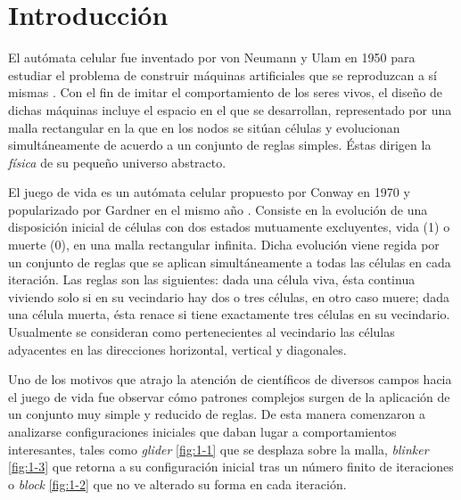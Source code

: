 \documentclass[../proyecto.tex]{book}
\begin{document}
\chapter{Introducción}

El autómata celular fue inventado por von Neumann y Ulam en 1950 para estudiar el problema de construir máquinas artificiales que se reproduzcan a sí mismas \cite{neummanUlam}. Con el fin de imitar el comportamiento de los seres vivos, el diseño de dichas máquinas incluye el espacio en el que se desarrollan, representado por una malla rectangular en la que en los nodos se sitúan células y evolucionan simultáneamente de acuerdo a un conjunto de reglas simples. Éstas dirigen la \textit{física} de su pequeño universo abstracto. 



El juego de vida es un autómata celular propuesto por Conway en 1970 y popularizado por Gardner en el mismo año \cite{primerap}. Consiste en la evolución de una disposición inicial de células con dos estados mutuamente excluyentes, vida (1) o muerte (0), en una malla rectangular infinita. Dicha evolución viene regida por un conjunto de reglas que se aplican simultáneamente a todas las células en cada iteración. Las reglas son las siguientes: dada una célula viva, ésta continua viviendo solo si en su vecindario hay dos o tres células, en otro caso muere; dada una célula muerta, ésta renace si tiene exactamente tres células en su vecindario. Usualmente se consideran como pertenecientes al vecindario las células adyacentes en las direcciones horizontal, vertical y diagonales.

Uno de los motivos que atrajo la atención de científicos de diversos campos hacia el juego de vida fue observar cómo patrones complejos surgen de la aplicación de un conjunto muy simple y reducido de reglas. De esta manera comenzaron a analizarse configuraciones iniciales que daban lugar a comportamientos interesantes, tales como \textit{glider} \autoref{fig:1-1} que se desplaza sobre la malla, \textit{blinker} \autoref{fig:1-3} que retorna a su configuración inicial tras un número finito de iteraciones o \textit{block} \autoref{fig:1-2} que no ve alterado su forma en cada iteración.
\end{document}

